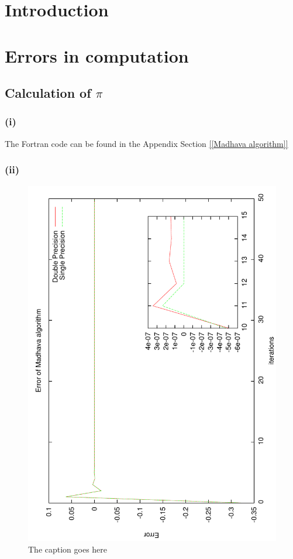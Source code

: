 \documentclass[twocolumn]{article}
\title{Assignment #2\\Computational Physics I - Phys381}
\author{Guilherme Contesini , 10140201}
\begin{document}
\twocolumn
\newpage														

\section{Introduction} 
\section{Errors in computation}													
\subsection{Calculation of $π$}													
\subsubsection{(i)}
The Fortran code can be found in the Appendix Section \ref{[Madhava algorithm]}							
\subsubsection{(ii)}			
\begin{figure}[!h]
\includegraphics[width=2.in\textwidth, angle=270]{ErrorofMadhavaalgorithm.pdf}
\caption{The caption goes here}
\end{figure}
\end{document}

